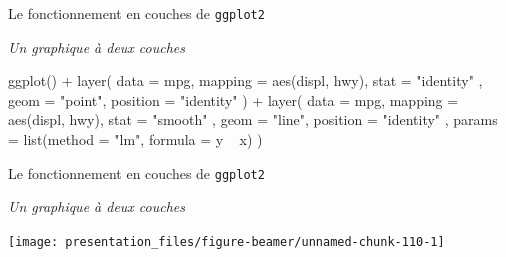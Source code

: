 \documentclass[12pt,handout,ignorenonframetext,]{beamer}
\newenvironment{Shaded}{}{}
\newcommand{\KeywordTok}[1]{\textcolor[rgb]{0.00,0.00,1.00}{{#1}}}
\newcommand{\DataTypeTok}[1]{{#1}}
\newcommand{\StringTok}[1]{\textcolor[rgb]{0.00,0.50,0.50}{{#1}}}
\newcommand{\NormalTok}[1]{{#1}}
\renewenvironment{Shaded}{\begin{snugshade}}{\end{snugshade}}
\begin{document}
\begin{frame}[fragile]{\large Le fonctionnement en \og couches \fg{} de
\texttt{ggplot2}}

\emph{Un graphique à deux couches}

\footnotesize \centering

\begin{Shaded}
\begin{Highlighting}[]
\KeywordTok{ggplot}\NormalTok{() +}\StringTok{ }\KeywordTok{layer}\NormalTok{(}
  \DataTypeTok{data =} \NormalTok{mpg, }\DataTypeTok{mapping =} \KeywordTok{aes}\NormalTok{(displ, hwy), }\DataTypeTok{stat =} \StringTok{"identity"}
  \NormalTok{, }\DataTypeTok{geom =} \StringTok{"point"}\NormalTok{, }\DataTypeTok{position =} \StringTok{"identity"}
\NormalTok{) +}\StringTok{ }\KeywordTok{layer}\NormalTok{(}
  \DataTypeTok{data =} \NormalTok{mpg, }\DataTypeTok{mapping =} \KeywordTok{aes}\NormalTok{(displ, hwy), }\DataTypeTok{stat =} \StringTok{"smooth"}
  \NormalTok{, }\DataTypeTok{geom =} \StringTok{"line"}\NormalTok{, }\DataTypeTok{position =} \StringTok{"identity"}
  \NormalTok{, }\DataTypeTok{params =} \KeywordTok{list}\NormalTok{(}\DataTypeTok{method =} \StringTok{"lm"}\NormalTok{, }\DataTypeTok{formula =} \NormalTok{y ~}\StringTok{ }\NormalTok{x)}
\NormalTok{)}
\end{Highlighting}
\end{Shaded}

\vfill

\vfill

\end{frame}

\begin{frame}{\large Le fonctionnement en \og couches \fg{} de
\texttt{ggplot2}}

\emph{Un graphique à deux couches}

\centering

\texttt{[image: presentation\_files/figure-beamer/unnamed-chunk-110-1]}

\end{frame}
\end{document}

